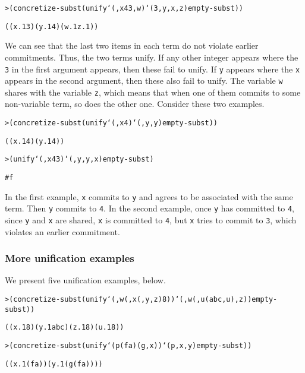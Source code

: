 \begin{alltt}
> (concretize-subst (unify `(,x 4 3 ,w) `(3 ,y ,x ,z) empty-subst))

((x.1 3) (y.1 4) (w.1 z.1))
\end{alltt}

\noindent
We can see that the last two items in each term do not violate earlier
commitments.  Thus, the two terms unify.  If any other integer appears
where the \texttt{3} in the first argument appears, then these fail to
unify.  If \texttt{y} appears where the \texttt{x} appears in the
second argument, then these also fail to unify.  The variable
\texttt{w} shares with the variable \texttt{z}, which means that when
one of them commits to some non-variable term, so does the other
one. Consider these two examples.

\begin{alltt}
> (concretize-subst (unify `(,x 4) `(,y ,y) empty-subst))

((x.1 4) (y.1 4))
\end{alltt}

\begin{alltt}
> (unify `(,x 4 3) `(,y ,y ,x) empty-subst)

#f
\end{alltt}
\noindent

\noindent
In the first example, \texttt{x} commits to \texttt{y} and agrees to
be associated with the same term.  Then \texttt{y} commits to
\texttt{4}.  In the second example, once \texttt{y} has committed to
\texttt{4}, since \texttt{y} and \texttt{x} are shared, \texttt{x} is
committed to \texttt{4}, but \texttt{x} tries to commit to \texttt{3},
which violates an earlier commitment.

\subsubsection{More unification examples}

We present five unification examples, below.

\begin{alltt}
> (concretize-subst (unify `(,w (,x (,y ,z) 8)) `(,w (,u (abc ,u) ,z)) empty-subst))

((x.1 8) (y.1 abc) (z.1 8) (u.1 8))
\end{alltt}

\begin{alltt}
> (concretize-subst (unify `(p (f a) (g ,x)) `(p ,x ,y) empty-subst))

((x.1 (f a)) (y.1 (g (f a))))
\end{alltt}


